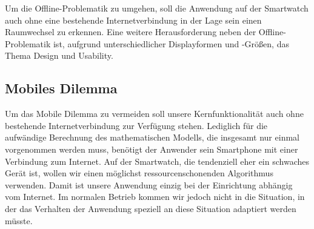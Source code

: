 Um die Offline-Problematik zu umgehen, soll die Anwendung auf der Smartwatch auch ohne eine bestehende Internetverbindung in der Lage sein einen Raumwechsel zu erkennen. Eine weitere Herausforderung neben der Offline-Problematik ist, aufgrund unterschiedlicher Displayformen und -Größen, das Thema Design und Usability.

\subsection{Mobiles Dilemma}
Um das Mobile Dilemma zu vermeiden soll unsere Kernfunktionalität auch ohne bestehende Internetverbindung zur Verfügung stehen. Lediglich für die aufwändige Berechnung des mathematischen Modells, die insgesamt nur einmal vorgenommen werden muss, benötigt der Anwender sein Smartphone mit einer Verbindung zum Internet. Auf der Smartwatch, die tendenziell eher ein schwaches Gerät ist, wollen wir einen möglichst ressourcenschonenden Algorithmus verwenden. Damit ist unsere Anwendung einzig bei der Einrichtung abhängig vom Internet. Im normalen Betrieb kommen wir jedoch nicht in die Situation, in der das Verhalten der Anwendung speziell an diese Situation adaptiert werden müsste.


